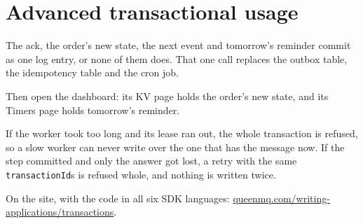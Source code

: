 
\section{Advanced transactional usage}

The ack, the order's new state, the next event and tomorrow's reminder commit as one log entry, or
none of them does. That one call replaces the outbox table, the idempotency table and the cron job.


Then open the dashboard: its KV page holds the order's new state, and its Timers page holds
tomorrow's reminder.


If the worker took too long and its lease ran out, the whole transaction is refused, so a slow
worker can never write over the one that has the message now. If the step committed and only the
answer got lost, a retry with the same \texttt{transactionId}s is refused whole, and nothing is
written twice.


On the site, with the code in all six SDK languages: \href{https://queenmq.com/writing-applications/transactions/}{queenmq.com/writing-applications/transactions}.
